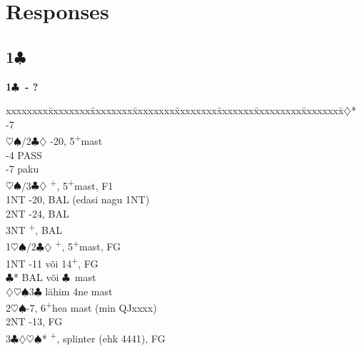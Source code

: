 \documentclass[10pt]{article}
\renewcommand{\c}{$\clubsuit$}
\renewcommand{\d}{$\diamondsuit$}
\newcommand{\h}{$\heartsuit$}
\newcommand{\s}{$\spadesuit$}
\newcommand{\p}{\textsuperscript{+}}
\newenvironment{bidtable}[1][]
{\textbf{#1}
  \begin{adjustwidth}{1em}{}
    \addvspace{2pt}
    \begin{tabbing}
      xxxxxxxx\=xxxxxxxx\=xxxxxxxx\=xxxxxxxx\=xxxxxxxx\=xxxxxxx\=xxxxxxxxx\=xxxxxxxx\=\kill}
{\end{tabbing}\end{adjustwidth}\bigskip}%
\newcommand{\pdfc}{\texorpdfstring{\c{}}{C}}
\begin{document}
\section{Responses}
\subsection{1\pdfc}

\begin{bidtable}[1\c\ - ?]
1\d*        {}-7                                         \\
            \h\s/2\c\d \> -20, 5\p mast              \\
            \>             -4        \> PASS           \\
            \>             -7        \> paku           \\
            \h\s/3\c\d \> \p, 5\p mast, F1           \\
            \> 1NT         -20, BAL (edasi nagu 1NT)  \\
            \> 2NT         -24, BAL                   \\
            \> 3NT         \p, BAL                    \\
1\h\s/2\c\d \> \p , 5\p mast, FG                          \\
1NT         -11 või 14\p , FG                          \\
            \c*        \> BAL või \c\ mast             \\
            \>             \d\h\s3\c \> \quad lähim 4ne mast \\
2\h\s       {}-7, 6\p hea mast (min QJxxxx)              \\
2NT         -13, FG                                   \\
3\c\d\h\s*  {}\p, splinter (ehk 4441), FG                \\
\end{bidtable}
\end{document}
